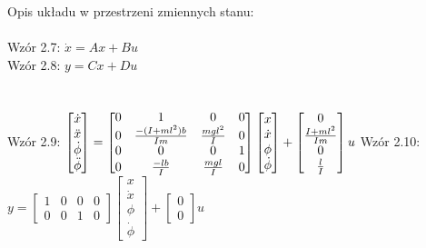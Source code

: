 \documentclass[a4paper,12pt,twoside,openany]{report}
\begin{document}
\noindent Opis układu w przestrzeni zmiennych stanu:\\
\\
\noindent Wzór 2.7: $\dot{x}=Ax+Bu$ \\
Wzór 2.8: $y=Cx+Du$ \\
\\
\\Wzór 2.9: $
     \begin{bmatrix}
       \dot{x} \\
       \ddot{x} \\
       \dot{\phi} \\
       \ddot{\phi}
     \end{bmatrix}
     =
     \begin{bmatrix}
       0 & 1 & 0 & 0          \\
       0 & \frac{-(I+ml^2)b}{Im} & \frac{mgl^2}{I} & 0 \\
       0 & 0 & 0 & 1 \\
       0 & \frac{-lb}{I} & \frac{mgl}{I} & 0 
     \end{bmatrix}
     \begin{bmatrix}
       x \\
       \dot{x} \\
       \phi \\
       \dot{\phi}
     \end{bmatrix}
     +
     \begin{bmatrix}
       0 \\
       \frac{I+ml^2}{Im} \\
       0 \\
       \frac{l}{I}
     \end{bmatrix}
     u\\$
Wzór 2.10: 
$y=
     \begin{bmatrix}
       1 & 0 & 0 & 0 \\
       0 & 0 & 1 & 0 
     \end{bmatrix}
     \begin{bmatrix}
       x \\
       \dot{x} \\
       \phi \\
       \dot{\phi}
     \end{bmatrix}
     +
     \begin{bmatrix}
       0 \\
       0 
     \end{bmatrix}
     u
$
\\
\\
\end{document}
